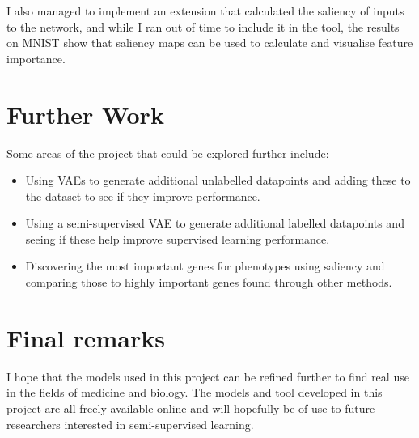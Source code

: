 I also managed to implement an extension that calculated the saliency of inputs to the network, and while I ran out of time to include it 
in the tool, the results on MNIST show that saliency maps can be used to calculate and visualise feature importance.

\section{Further Work}

Some areas of the project that could be explored further include:
\begin{itemize}
    \item Using VAEs to generate additional unlabelled datapoints and adding these to the dataset to see if they improve performance.
    \item Using a semi-supervised VAE to generate additional labelled datapoints and seeing if these help improve supervised learning 
          performance.
    \item Discovering the most important genes for phenotypes using saliency and comparing those to highly important genes found through
          other methods.  
\end{itemize}

\section{Final remarks}

I hope that the models used in this project can be refined further to find real use in the fields of medicine and biology. The models and tool
developed in this project are all freely available online and will hopefully be of use to future researchers interested in semi-supervised
learning.